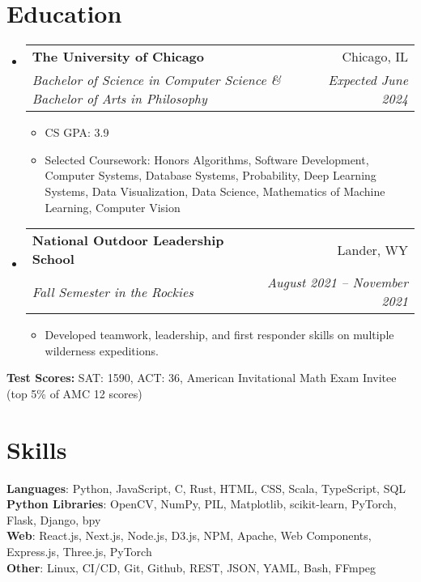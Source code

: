 \documentclass[letterpaper,11pt]{article}
\makeatletter
\newcommand{\resumeItem}[1]{
  \item\small{
    {#1 \vspace{-2pt}}
  }
}
\newcommand{\resumeSubheading}[4]{
  \vspace{-2pt}\item
    \begin{tabular*}{0.97\textwidth}[t]{l@{\extracolsep{\fill}}r}
      \textbf{#1} & #2 \\
      \textit{\small#3} & \textit{\small #4} \\
    \end{tabular*}\vspace{-7pt}
}
\newcommand{\resumeSubHeadingListStart}{\begin{itemize}[leftmargin=0.125in, label={}]}
\newcommand{\resumeSubHeadingListEnd}{\end{itemize}}
\newcommand{\resumeItemListStart}{\begin{itemize}[leftmargin=0.185in]
}
\newcommand{\resumeItemListEnd}{\end{itemize}\vspace{-5pt}}
\makeatother
\begin{document}
\section{Education}
  \resumeSubHeadingListStart
    \resumeSubheading
      {The University of Chicago}{Chicago, IL}
      {Bachelor of Science in Computer Science \& Bachelor of Arts in Philosophy}{Expected June 2024}
      \resumeItemListStart
        \resumeItem{CS GPA: 3.9}
        \resumeItem{{Selected Coursework:} 
        Honors Algorithms,
        Software Development,
        Computer Systems,
        Database Systems,
        Probability,
        Deep Learning Systems,
        Data Visualization,
        Data Science,
        Mathematics of Machine Learning,
        Computer Vision
        }
      \resumeItemListEnd

    \resumeSubheading
      {National Outdoor Leadership School}{Lander, WY}
      {Fall Semester in the Rockies}{August 2021 -- November 2021}
      \resumeItemListStart
        \resumeItem{Developed teamwork, leadership, and first responder skills on multiple wilderness expeditions.}
      \resumeItemListEnd
  \resumeSubHeadingListEnd
  {
    \vspace{-4pt}
    \noindent\hspace{0.15in}\small\textbf{Test Scores:} SAT: 1590, ACT: 36, American Invitational Math Exam Invitee (top 5\% of AMC 12 scores)
    \vspace{-5pt}
    }
\section{Skills}
  \begin{itemize}[leftmargin=0.15in, label={}]
    \small{\item{
      \textbf{Languages}{:
      Python,
      JavaScript,
      C,
      Rust,
      HTML,
      CSS,
      Scala,
      TypeScript,
      SQL} \\
      \textbf{Python Libraries}{: 
      OpenCV,
      NumPy,
      PIL,
      Matplotlib,
      scikit-learn,
      PyTorch,
      Flask,
      Django,
      bpy} \\
      \textbf{Web}{: 
      React.js, 
      Next.js,
      Node.js,
      D3.js,
      NPM, 
      Apache,
      Web Components,
      Express.js,
      Three.js,
      PyTorch
      }
      \\
      \textbf{Other}{:
        Linux,
        CI/CD,
        Git, 
        Github,
        REST,
        JSON, 
        YAML,
        Bash,
        FFmpeg 
        }}}
      {\vspace{-5pt}}
  \end{itemize}
\end{document}
